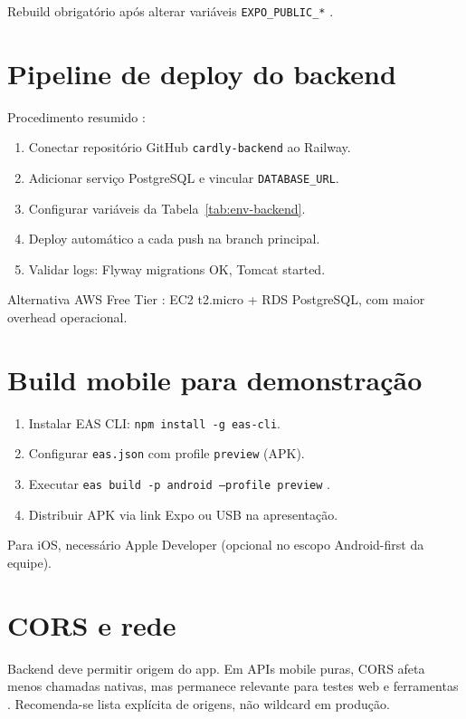 Rebuild obrigatório após alterar variáveis \texttt{EXPO\_PUBLIC\_*} \cite{expo_docs}.

\section{Pipeline de deploy do backend}

Procedimento resumido \cite{railway_docs}:
\begin{enumerate}
    \item Conectar repositório GitHub \texttt{cardly-backend} ao Railway.
    \item Adicionar serviço PostgreSQL e vincular \texttt{DATABASE\_URL}.
    \item Configurar variáveis da Tabela~\ref{tab:env-backend}.
    \item Deploy automático a cada push na branch principal.
    \item Validar logs: Flyway migrations OK, Tomcat started.
\end{enumerate}

Alternativa AWS Free Tier \cite{aws_free_tier}: EC2 t2.micro + RDS PostgreSQL, com maior overhead operacional.

\section{Build mobile para demonstração}

\begin{enumerate}
    \item Instalar EAS CLI: \texttt{npm install -g eas-cli}.
    \item Configurar \texttt{eas.json} com profile \texttt{preview} (APK).
    \item Executar \texttt{eas build -p android --profile preview} \cite{expo_eas_build}.
    \item Distribuir APK via link Expo ou USB na apresentação.
\end{enumerate}

Para iOS, necessário Apple Developer (opcional no escopo Android-first da equipe).

\section{CORS e rede}

Backend deve permitir origem do app. Em APIs mobile puras, CORS afeta menos chamadas nativas, mas permanece relevante para testes web e ferramentas \cite{helmet_cors_spring}. Recomenda-se lista explícita de origens, não wildcard em produção.

